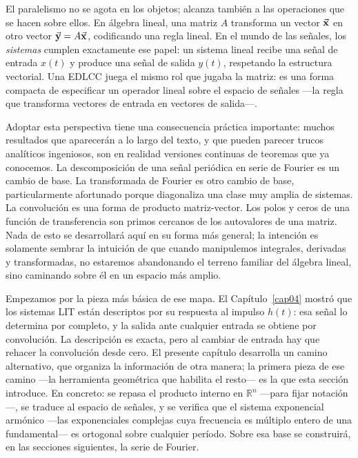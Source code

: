 \documentclass[class=book, crop=false]{standalone}
\begin{document}
El paralelismo no se agota en los objetos; alcanza también a las operaciones que se hacen sobre ellos. En álgebra lineal, una matriz $A$ transforma un vector $\vec{\mathbf{x}}$ en otro vector $\vec{\mathbf{y}} = A\vec{\mathbf{x}}$, codificando una regla lineal. En el mundo de las señales, los \emph{sistemas} cumplen exactamente ese papel: un sistema lineal recibe una señal de entrada $x(t)$ y produce una señal de salida $y(t)$, respetando la estructura vectorial. Una EDLCC juega el mismo rol que jugaba la matriz: es una forma compacta de especificar un operador lineal sobre el espacio de señales ---la regla que transforma vectores de entrada en vectores de salida---.

Adoptar esta perspectiva tiene una consecuencia práctica importante: muchos resultados que aparecerán a lo largo del texto, y que pueden parecer trucos analíticos ingeniosos, son en realidad versiones continuas de teoremas que ya conocemos. La descomposición de una señal periódica en serie de Fourier es un cambio de base. La transformada de Fourier es otro cambio de base, particularmente afortunado porque diagonaliza una clase muy amplia de sistemas. La convolución es una forma de producto matriz-vector. Los polos y ceros de una función de transferencia son primos cercanos de los autovalores de una matriz. Nada de esto se desarrollará aquí en su forma más general; la intención es solamente sembrar la intuición de que cuando manipulemos integrales, derivadas y transformadas, no estaremos abandonando el terreno familiar del álgebra lineal, sino caminando sobre él en un espacio más amplio.

Empezamos por la pieza más básica de ese mapa. El Capítulo~\ref{cap04} mostró que los sistemas LIT están descriptos por su respuesta al impulso $h(t)$: esa señal lo determina por completo, y la salida ante cualquier entrada se obtiene por convolución. La descripción es exacta, pero al cambiar de entrada hay que rehacer la convolución desde cero. El presente capítulo desarrolla un camino alternativo, que organiza la información de otra manera; la primera pieza de ese camino —la herramienta geométrica que habilita el resto— es la que esta sección introduce. En concreto: se repasa el producto interno en $\mathbb{R}^n$ —para fijar notación—, se traduce al espacio de señales, y se verifica que el sistema exponencial armónico —las exponenciales complejas cuya frecuencia es múltiplo entero de una fundamental— es ortogonal sobre cualquier período. Sobre esa base se construirá, en las secciones siguientes, la serie de Fourier.
\end{document}
